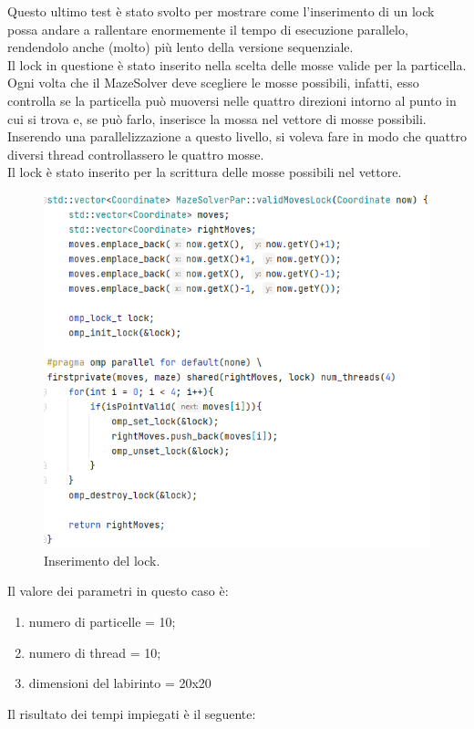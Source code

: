 \documentclass[10pt,twocolumn,letterpaper]{article}
\begin{document}
Questo ultimo test è stato svolto per mostrare come l'inserimento di un lock possa andare a rallentare enormemente il tempo di esecuzione parallelo, rendendolo anche (molto) più lento della versione sequenziale.\\
Il lock in questione è stato inserito nella scelta delle mosse valide per la particella. Ogni volta che il MazeSolver deve scegliere le mosse possibili, infatti, esso controlla se la particella può muoversi nelle quattro direzioni intorno al punto in cui si trova e, se può farlo, inserisce la mossa nel vettore di mosse possibili. Inserendo una parallelizzazione a questo livello, si voleva fare in modo che quattro diversi thread controllassero le quattro mosse.\\
Il lock è stato inserito per la scrittura delle mosse possibili nel vettore.\begin{figure}[H]
\includegraphics[width=1\linewidth]{code/lock.png} 
\caption{\small Inserimento del lock.}
\label{lock}
\end{figure}
Il valore dei parametri in questo caso è:
\begin{enumerate}[-]
\item{numero di particelle = 10;}
\item{numero di thread = 10;}
\item{dimensioni del labirinto = 20x20}
\end{enumerate}
Il risultato dei tempi impiegati è il seguente:
\end{document}
